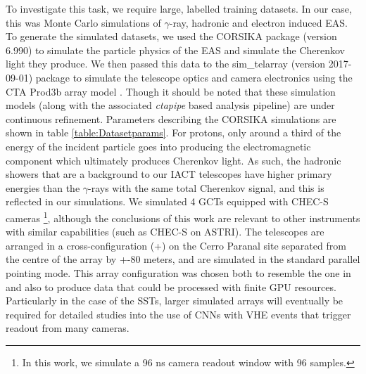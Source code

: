 To investigate this task, we require large, labelled training datasets. In our case, this was Monte Carlo simulations of $\gamma$-ray, hadronic and electron induced EAS. To generate the simulated datasets, we used the CORSIKA package (version 6.990) \cite{corsika} to simulate the particle physics of the EAS and simulate the Cherenkov light they produce. We then passed this data to the sim\_telarray (version 2017-09-01) package \cite{BERNLOHR} to simulate the telescope optics and camera electronics using the CTA Prod3b array model \cite{prod3b}. Though it should be noted that these simulation models (along with the associated \textit{ctapipe} based analysis pipeline) are under continuous refinement. Parameters describing the CORSIKA simulations are shown in table \ref{table:Datasetparams}. For protons, only around a third of the energy of the incident particle goes into producing the electromagnetic component which ultimately produces Cherenkov light. As such, the hadronic showers that are a background to our IACT telescopes have higher primary energies than the $\gamma$-rays with the same total Cherenkov signal, and this is reflected in our simulations. We simulated 4 GCTs \cite{gct} equipped with CHEC-S cameras \footnote{In this work, we simulate a 96 ns camera readout window with 96 samples.}, although the conclusions of this work are relevant to other instruments with similar capabilities (such as CHEC-S on ASTRI). The telescopes are arranged in a cross-configuration (+) on the Cerro Paranal site separated from the centre of the array by +-80 meters, and are simulated in the standard parallel pointing mode. This array configuration was chosen both to resemble the one in \cite{Shilon} and also to produce data that could be processed with finite GPU resources. Particularly in the case of the SSTs, larger simulated arrays will eventually be required for detailed studies into the use of CNNs with VHE events that trigger readout from many cameras.

